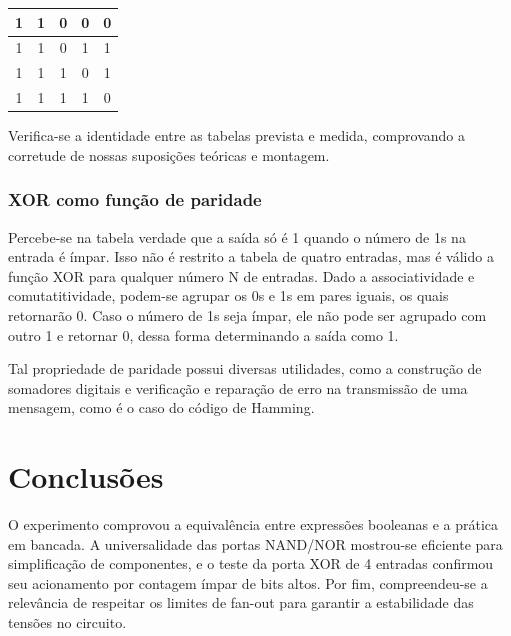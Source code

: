 \documentclass[12pt]{article}
\begin{document}
\begin{table}[H]
\begin{tabular}{|c|c|c|c|c|}
        \hline

        1 & 1 & 0 & 0 & 0 \\

        \hline

        1 & 1 & 0 & 1 & 1 \\

        \hline

        1 & 1 & 1 & 0 & 1 \\

        \hline

        1 & 1 & 1 & 1 & 0 \\

        \hline

    \end{tabular}

\end{table}

Verifica-se a identidade entre as tabelas prevista e medida,
comprovando a corretude de nossas suposições teóricas e montagem.

\subsubsection{XOR como função de paridade}

Percebe-se na tabela verdade que a saída só é 1
quando o número de 1s na entrada é ímpar. Isso não é restrito
a tabela de quatro entradas, mas é válido 
a função XOR para qualquer número N de entradas. Dado a associatividade
e comutatitividade, podem-se agrupar os 0s e 1s em
pares iguais, os quais retornarão 0. Caso o número de 1s seja ímpar,
ele não pode ser agrupado com outro 1 e retornar 0, dessa forma
determinando a saída como 1.

\noindent Tal propriedade de paridade \cite{parity} possui diversas utilidades, como a construção de somadores
digitais e verificação e reparação de erro na transmissão de uma mensagem, como é o caso do
código de Hamming.

\section{Conclusões}
\label{sec:Conclusao}

O experimento comprovou a equivalência entre expressões booleanas
e a prática em bancada. A universalidade das portas NAND/NOR mostrou-se eficiente
para simplificação de componentes, e o teste da porta XOR de 4 entradas confirmou seu
acionamento por contagem ímpar de bits altos. Por fim, compreendeu-se a relevância de
respeitar os limites de fan-out para garantir a estabilidade das tensões no circuito.
\end{document}
